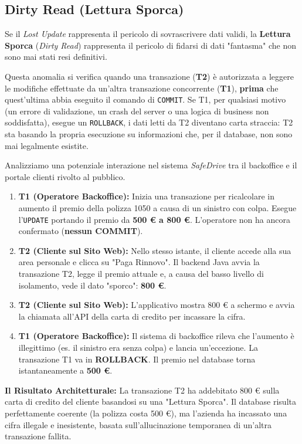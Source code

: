 \subsection{Dirty Read (Lettura Sporca)}

Se il \textit{Lost Update} rappresenta il pericolo di sovrascrivere dati validi, la \textbf{Lettura Sporca} (\textit{Dirty Read}) rappresenta il pericolo di fidarsi di dati "fantasma" che non sono mai stati resi definitivi.

Questa anomalia si verifica quando una transazione (\textbf{T2}) è autorizzata a leggere le modifiche effettuate da un'altra transazione concorrente (\textbf{T1}), \textbf{prima} che quest'ultima abbia eseguito il comando di \texttt{COMMIT}.
Se T1, per qualsiasi motivo (un errore di validazione, un crash del server o una logica di business non soddisfatta), esegue un \texttt{ROLLBACK}, i dati letti da T2 diventano carta straccia: T2 sta basando la propria esecuzione su informazioni che, per il database, non sono mai legalmente esistite.

\begin{example}
Analizziamo una potenziale interazione nel sistema \textit{SafeDrive} tra il backoffice e il portale clienti rivolto al pubblico.

\begin{enumerate}
    \item \textbf{T1 (Operatore Backoffice):} Inizia una transazione per ricalcolare in aumento il premio della polizza 1050 a causa di un sinistro con colpa. Esegue l'\texttt{UPDATE} portando il premio da \textbf{500 € a 800 €}. L'operatore non ha ancora confermato (\textbf{nessun COMMIT}).
    \item \textbf{T2 (Cliente sul Sito Web):} Nello stesso istante, il cliente accede alla sua area personale e clicca su "Paga Rinnovo". Il backend Java avvia la transazione T2, legge il premio attuale e, a causa del basso livello di isolamento, vede il dato "sporco": \textbf{800 €}.
    \item \textbf{T2 (Cliente sul Sito Web):} L'applicativo mostra 800 € a schermo e avvia la chiamata all'API della carta di credito per incassare la cifra.
    \item \textbf{T1 (Operatore Backoffice):} Il sistema di backoffice rileva che l'aumento è illegittimo (es. il sinistro era senza colpa) e lancia un'eccezione. La transazione T1 va in \textbf{ROLLBACK}. Il premio nel database torna istantaneamente a \textbf{500 €}.
\end{enumerate}

\textbf{Il Risultato Architetturale:} La transazione T2 ha addebitato 800 € sulla carta di credito del cliente basandosi su una "Lettura Sporca". Il database risulta perfettamente coerente (la polizza costa 500 €), ma l'azienda ha incassato una cifra illegale e inesistente, basata sull'allucinazione temporanea di un'altra transazione fallita.
\end{example}


